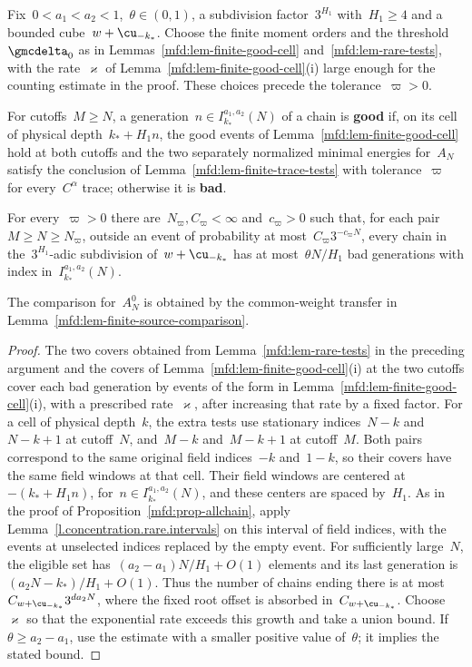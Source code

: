 \documentclass[11pt]{amsart}
\begin{document}
Fix~$0<a_1<a_2<1$,~$\theta\in(0,1)$, a subdivision factor~$3^{H_1}$ with~$H_1\geq4$ and a bounded cube~$w+\cu_{-k_*}$. Choose the finite moment orders and the threshold~$\gmcdelta_0$ as in Lemmas~\ref{mfd:lem-finite-good-cell} and~\ref{mfd:lem-rare-tests}, with the rate~$\varkappa$ of Lemma~\ref{mfd:lem-finite-good-cell}(i) large enough for the counting estimate in the proof. These choices precede the tolerance~$\varpi>0$.

For cutoffs~$M\geq N$, a generation~$n\in I_{k_*}^{a_1,a_2}(N)$ of a chain is \textbf{good} if, on its cell of physical depth~$k_*+H_1n$, the good events of Lemma~\ref{mfd:lem-finite-good-cell} hold at both cutoffs and the two separately normalized minimal energies for~$A_N$ satisfy the conclusion of Lemma~\ref{mfd:lem-finite-trace-tests} with tolerance~$\varpi$ for every~$C^\alpha$ trace; otherwise it is \textbf{bad}.

\begin{lemma}
\label{mfd:lem-finite-good-levels}
For every~$\varpi>0$ there are~$N_\varpi,C_\varpi<\infty$ and~$c_\varpi>0$ such that, for each pair~$M\geq N\geq N_\varpi$, outside an event of probability at most~$C_\varpi3^{-c_\varpi N}$, every chain in the~$3^{H_1}$-adic subdivision of~$w+\cu_{-k_*}$ has at most~$\theta N/H_1$ bad generations with index in~$I_{k_*}^{a_1,a_2}(N)$.
\end{lemma}

The comparison for~$A_N^0$ is obtained by the common-weight transfer in Lemma~\ref{mfd:lem-finite-source-comparison}.

\begin{proof}
The two covers obtained from Lemma~\ref{mfd:lem-rare-tests} in the preceding argument and the covers of Lemma~\ref{mfd:lem-finite-good-cell}(i) at the two cutoffs cover each bad generation by events of the form in Lemma~\ref{mfd:lem-finite-good-cell}(i), with a prescribed rate~$\varkappa$, after increasing that rate by a fixed factor. For a cell of physical depth~$k$, the extra tests use stationary indices~$N-k$ and~$N-k+1$ at cutoff~$N$, and~$M-k$ and~$M-k+1$ at cutoff~$M$. Both pairs correspond to the same original field indices~$-k$ and~$1-k$, so their covers have the same field windows at that cell. Their field windows are centered at~$-(k_*+H_1n)$, for~$n\in I_{k_*}^{a_1,a_2}(N)$, and these centers are spaced by~$H_1$. As in the proof of Proposition~\ref{mfd:prop-allchain}, apply Lemma~\ref{l.concentration.rare.intervals} on this interval of field indices, with the events at unselected indices replaced by the empty event. For sufficiently large~$N$, the eligible set has~$(a_2-a_1)N/H_1+O(1)$ elements and its last generation is~$(a_2N-k_*)/H_1+O(1)$. Thus the number of chains ending there is at most~$C_{w+\cu_{-k_*}}3^{da_2N}$, where the fixed root offset is absorbed in~$C_{w+\cu_{-k_*}}$. Choose~$\varkappa$ so that the exponential rate exceeds this growth and take a union bound. If~$\theta\geq a_2-a_1$, use the estimate with a smaller positive value of~$\theta$; it implies the stated bound.
\end{proof}
\end{document}
